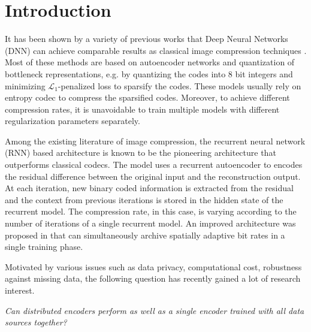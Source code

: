 \documentclass[10pt,twocolumn,letterpaper]{article}
\begin{document}
\section{Introduction}
It has been shown by a variety of previous works that Deep Neural Networks (DNN) can achieve comparable results as classical image compression techniques \cite{toderici2015variable,balle2016end,gregor2016towards,toderici2017full,theis2017lossy,johnston2017improved,liu2018cnn}. Most of these methods are based on autoencoder networks and quantization of bottleneck representations, e.g. by quantizing the codes into 8 bit integers and minimizing $\mathcal{L}_1$-penalized loss to sparsify the codes. These models usually rely on entropy codec to compress the sparsified codes. Moreover, to achieve different compression rates, it is unavoidable to train multiple models with different regularization parameters separately.

Among the existing literature of image compression, the recurrent neural network (RNN) based architecture \cite{toderici2015variable} is known to be the pioneering architecture that outperforms classical codecs. The model uses a recurrent autoencoder to encodes the residual difference between the original input and the reconstruction output. At each iteration, new binary coded information is extracted from the residual and the context from previous iterations is stored in the hidden state of the recurrent model. The compression rate, in this case, is varying according to the number of iterations of a single recurrent model. An improved architecture was proposed in \cite{johnston2017improved} that can simultaneously archive spatially adaptive bit rates in a single training phase. 

Motivated by various issues such as data privacy, computational cost, robustness against missing data, the following question has recently gained a lot of research interest. 

\textit{Can distributed encoders perform as well as a single encoder trained with all data sources together?} 
\end{document}
